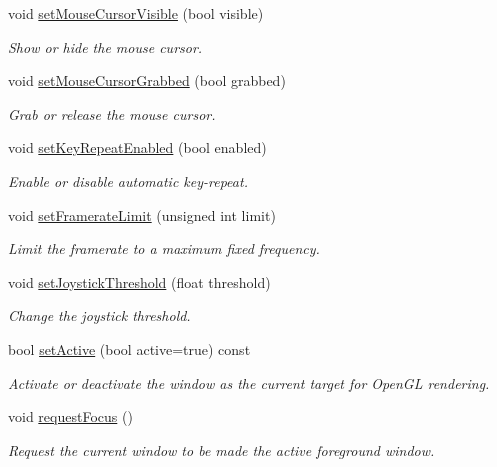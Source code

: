 \begin{DoxyCompactItemize}
void \hyperlink{classsf_1_1_window_aad3991c25e0a83afbb4d62febf9b7b14}{set\+Mouse\+Cursor\+Visible} (bool visible)
\begin{DoxyCompactList}\small\item\em Show or hide the mouse cursor. \end{DoxyCompactList}\item 
void \hyperlink{classsf_1_1_window_a5b4ef8ede77531e17b7a0287fa6ff9ce}{set\+Mouse\+Cursor\+Grabbed} (bool grabbed)
\begin{DoxyCompactList}\small\item\em Grab or release the mouse cursor. \end{DoxyCompactList}\item 
void \hyperlink{classsf_1_1_window_aef9f2b14c10ecba8a8df95dd51c5bb73}{set\+Key\+Repeat\+Enabled} (bool enabled)
\begin{DoxyCompactList}\small\item\em Enable or disable automatic key-\/repeat. \end{DoxyCompactList}\item 
void \hyperlink{classsf_1_1_window_af4322d315baf93405bf0d5087ad5e784}{set\+Framerate\+Limit} (unsigned int limit)
\begin{DoxyCompactList}\small\item\em Limit the framerate to a maximum fixed frequency. \end{DoxyCompactList}\item 
void \hyperlink{classsf_1_1_window_aa45b8f54e29a6f59f1fc7ee66b2fab68}{set\+Joystick\+Threshold} (float threshold)
\begin{DoxyCompactList}\small\item\em Change the joystick threshold. \end{DoxyCompactList}\item 
bool \hyperlink{classsf_1_1_window_aaab549da64cedf74fa6f1ae7a3cc79e0}{set\+Active} (bool active=true) const
\begin{DoxyCompactList}\small\item\em Activate or deactivate the window as the current target for Open\+GL rendering. \end{DoxyCompactList}\item 
void \hyperlink{classsf_1_1_window_a58cf7fa1775e8e7542032e3ecfa83b49}{request\+Focus} ()
\begin{DoxyCompactList}\small\item\em Request the current window to be made the active foreground window. \end{DoxyCompactList}\item 

\end{DoxyCompactItemize}
